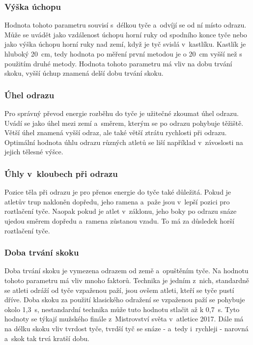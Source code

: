 \subsubsection{Výška úchopu}

Hodnota tohoto parametru souvisí s~délkou tyče a~odvíjí se od ní místo odrazu. Může se uvádět jako vzdálenost úchopu horní ruky od spodního konce tyče nebo jako výška úchopu horní ruky nad zemí, když je tyč svislá v~kastlíku. Kastlík je hluboký 20~cm, tedy hodnota po měření první metodou je o 20~cm vyšší než s použitím druhé metody. Hodnota tohoto parametru má vliv na dobu trvání skoku, vyšší úchup znamená delší dobu trvání skoku.

\subsubsection{Úhel odrazu}

Pro správný převod energie rozběhu do tyče je užitečné zkoumat úhel odrazu. Uvádí se jako úhel mezi zemí a~směrem, kterým se po odrazu pohybuje těžiště. Větší úhel znamená vyšší odraz, ale také větší ztrátu rychlosti při odrazu. Optimální hodnota úhlu odrazu různých atletů se liší například v~závoslosti na jejich tělesné výšce.

\subsubsection{Úhly v~kloubech při odrazu}

Pozice těla při odrazu je pro přenos energie do tyče také důležitá. Pokud je atletův trup nakloněn dopředu, jeho ramena a~paže jsou v~lepší pozici pro roztlačení tyče. Naopak pokud je atlet v~záklonu, jeho boky po odrazu snáze ujedou směrem dopředu a~ramena zůstanou vzadu. To má za důsledek horší roztlačení tyče.

\subsubsection{Doba trvání skoku}

Doba trvání skoku je vymezena odrazem od země a~opuštěním tyče. Na hodnotu tohoto parametru má vliv mnoho faktorů. Technika je jedním z~nich, standardně se atleti odráží od tyče vzpaženou paží, jsou ovšem atleti, kteří se tyče pustí dříve. Doba skoku za použití klasického odražení se vzpaženou paží se pohybuje okolo 1,3~s, nestandardní technika může tuto hodnotu stlačit až k 0,7~s. Tyto hodnoty se týkají mužského finále z~Mistrovství světa v~atletice 2017. Dále má na délku skoku vliv tvrdost tyče, tvrdší tyč se snáze - a~tedy i~rychleji - narovná a~skok tak trvá kratší dobu.

